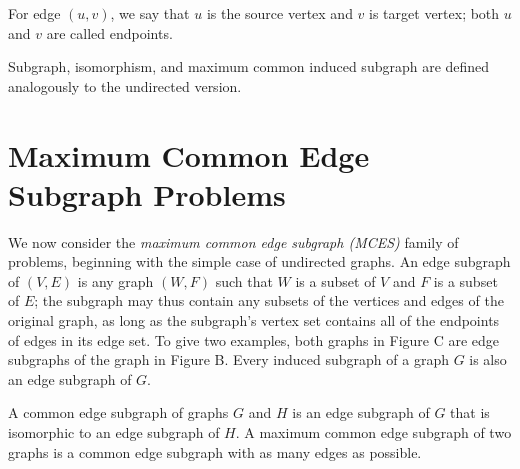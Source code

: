 For edge $(u,v)$, we say that $u$ is the source vertex and $v$ is target vertex; both
$u$ and $v$ are called endpoints.

Subgraph, isomorphism, and maximum common induced subgraph are defined
analogously to the undirected version.

% 
% 
% 
% 

\section{Maximum Common Edge Subgraph Problems}

We now consider the \emph{maximum common edge subgraph (MCES)} family of problems,
beginning with the simple case of undirected graphs. An edge subgraph of $(V, E)$
is any graph $(W, F)$ such that $W$ is a subset of $V$ and $F$ is a subset of $E$; the
subgraph may thus contain any subsets of the vertices and edges of the original
graph, as long as the subgraph’s vertex set contains all of the endpoints of
edges in its edge set. To give two examples, both graphs in Figure C are edge
subgraphs of the graph in Figure B. Every induced subgraph of a graph $G$ is also
an edge subgraph of $G$.

A common edge subgraph of graphs $G$ and $H$ is an edge subgraph of $G$ that is
isomorphic to an edge subgraph of $H$. A maximum common edge subgraph of two
graphs is a common edge subgraph with as many edges as possible.


